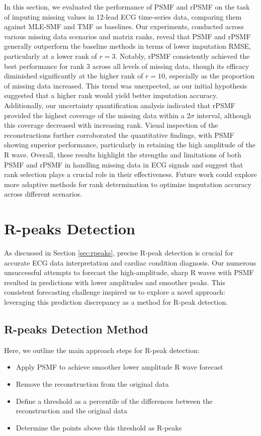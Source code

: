 \documentclass{mldsmsc}
\begin{document}
\noindent In this section, we evaluated the performance of PSMF and rPSMF on the task of imputing missing values in 12-lead ECG time-series data, comparing them against MLE-SMF and TMF as baselines. Our experiments, conducted across various missing data scenarios and matrix ranks, reveal that PSMF and rPSMF generally outperform the baseline methods in terms of lower imputation RMSE, particularly at a lower rank of $r = 3$. Notably, rPSMF consistently achieved the best performance for rank 3 across all levels of missing data, though its efficacy diminished significantly at the higher rank of $r = 10$, especially as the proportion of missing data increased. This trend was unexpected, as our initial hypothesis suggested that a higher rank would yield better imputation accuracy. Additionally, our uncertainty quantification analysis indicated that rPSMF provided the highest coverage of the missing data within a $2\sigma$ interval, although this coverage decreased with increasing rank. Visual inspection of the reconstructions further corroborated the quantitative findings, with PSMF showing superior performance, particularly in retaining the high amplitude of the R wave. Overall, these results highlight the strengths and limitations of both PSMF and rPSMF in handling missing data in ECG signals and suggest that rank selection plays a crucial role in their effectiveness. Future work could explore more adaptive methods for rank determination to optimize imputation accuracy across different scenarios.

\section{R-peaks Detection}\label{sec:rpeaksdet}

As discussed in Section \ref{sec:rpeaks}, precise R-peak detection is crucial for accurate ECG data interpretation and cardiac condition diagnosis. Our numerous unsuccessful attempts to forecast the high-amplitude, sharp R waves with PSMF resulted in predictions with lower amplitudes and smoother peaks. This consistent forecasting challenge inspired us to explore a novel approach: leveraging this prediction discrepancy as a method for R-peak detection.

\subsection{R-peaks Detection Method}

\noindent Here, we outline the main approach steps for R-peak detection:
\begin{itemize}
    \item Apply PSMF to achieve smoother lower amplitude R wave forecast
    \item Remove the reconstruction from the original data
    \item Define a threshold as a percentile of the differences between the reconstruction and the original data
    \item Determine the points above this threshold as R-peaks
\end{itemize}
\end{document}
